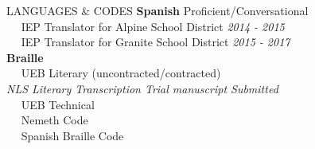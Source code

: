 \documentclass{resume} %
\begin{document}
\begin{rSection}{LANGUAGES \& CODES}
	{\bf Spanish} \hfill {Proficient/Conversational}
	\\\textbullet~~ IEP Translator for Alpine School District \hfill {\em 2014 - 2015}
	\\\textbullet~~ IEP Translator for Granite School District \hfill {\em 2015 - 2017}
	\\{\bf Braille} 
	\\\textbullet~~ UEB Literary (uncontracted/contracted)
    \\\textit{NLS Literary Transcription Trial manuscript Submitted}
    \\ \textbullet~~ UEB Technical
	\\ \textbullet~~ Nemeth Code 
	\\ \textbullet~~ Spanish Braille Code 
\end{rSection}
\end{document}
